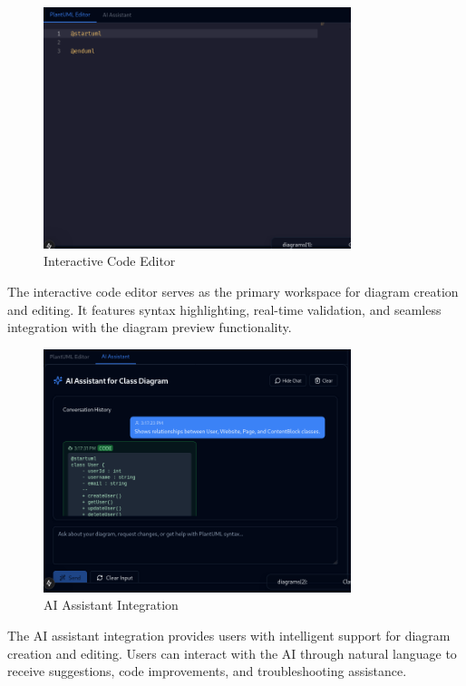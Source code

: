 \begin{figure}[H]
\centering
\includegraphics[width=0.8\textwidth]{screenshots/code-editor.png}
\caption{Interactive Code Editor}
\end{figure}

The interactive code editor serves as the primary workspace for diagram creation and editing. It features syntax highlighting, real-time validation, and seamless integration with the diagram preview functionality.

\begin{figure}[H]
\centering
\includegraphics[width=0.8\textwidth]{screenshots/AI-assistant.png}
\caption{AI Assistant Integration}
\end{figure}

The AI assistant integration provides users with intelligent support for diagram creation and editing. Users can interact with the AI through natural language to receive suggestions, code improvements, and troubleshooting assistance.

